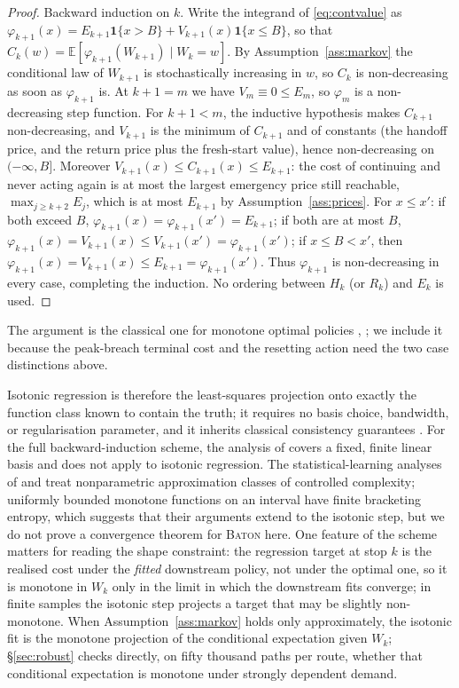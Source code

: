 \documentclass[preprint,authoryear,12pt]{elsarticle}
\theoremstyle{definition}
\theoremstyle{remark}
\begin{document}
\begin{proof}
Backward induction on $k$. Write the integrand of \eqref{eq:contvalue}
as $\varphi_{k+1}(x) = E_{k+1}\mathbf 1\{x > B\} +
V_{k+1}(x)\mathbf 1\{x \le B\}$, so that
$C_k(w) = \mathbb E[\varphi_{k+1}(W_{k+1}) \mid W_k = w]$. By
Assumption~\ref{ass:markov} the conditional law of $W_{k+1}$ is
stochastically increasing in $w$, so $C_k$ is non-decreasing as soon as
$\varphi_{k+1}$ is. At $k+1 = m$ we have $V_m \equiv 0 \le E_m$, so
$\varphi_m$ is a non-decreasing step function. For $k+1 < m$, the
inductive hypothesis makes $C_{k+1}$ non-decreasing, and $V_{k+1}$ is the
minimum of $C_{k+1}$ and of constants (the handoff price, and the
return price plus the fresh-start value), hence non-decreasing on
$(-\infty,B]$. Moreover $V_{k+1}(x) \le C_{k+1}(x) \le E_{k+1}$: the
cost of continuing and never acting again is at most the largest
emergency price still reachable, $\max_{j \ge k+2} E_j$, which is at most
$E_{k+1}$ by Assumption~\ref{ass:prices}. For $x \le x'$: if both
exceed $B$, $\varphi_{k+1}(x) = \varphi_{k+1}(x') = E_{k+1}$; if both
are at most $B$, $\varphi_{k+1}(x) = V_{k+1}(x) \le V_{k+1}(x') =
\varphi_{k+1}(x')$; if $x \le B < x'$, then
$\varphi_{k+1}(x) = V_{k+1}(x) \le E_{k+1} = \varphi_{k+1}(x')$. Thus
$\varphi_{k+1}$ is non-decreasing in every case, completing the
induction. No ordering between $H_k$ (or $R_k$) and $E_k$ is used.
\end{proof}

The argument is the classical one for monotone optimal policies
\citep{serfozo1976monotone}, \citep[\S4.7]{puterman1994markov}; we
include it because the peak-breach terminal cost and the resetting
action need the two case distinctions above.

Isotonic regression is therefore the least-squares projection onto
exactly the function class known to contain the truth; it requires no
basis choice, bandwidth, or regularisation parameter, and it inherits
classical consistency guarantees
\citep{robbins1955empirical,barlow1972statistical}. For the full
backward-induction scheme, the analysis of \citet{clement2002analysis}
covers a fixed, finite linear basis and does not apply to isotonic
regression. The statistical-learning analyses of
\citet{egloff2005monte} and \citet{zanger2013quantitative} treat
nonparametric approximation classes of controlled complexity; uniformly
bounded monotone functions on an interval have finite bracketing
entropy, which suggests that their arguments extend to the isotonic
step, but we do not prove a convergence theorem for \textsc{Baton}
here. One feature of the scheme matters for reading the shape
constraint: the regression target at stop $k$ is the realised cost under
the \emph{fitted} downstream policy, not under the optimal one, so it is
monotone in $W_k$ only in the limit in which the downstream fits
converge; in finite samples the isotonic step projects a target that may
be slightly non-monotone. When Assumption~\ref{ass:markov} holds only
approximately, the isotonic fit is the monotone projection of the
conditional expectation given $W_k$; \S\ref{sec:robust} checks directly,
on fifty thousand paths per route, whether that conditional expectation
is monotone under strongly dependent demand.
\end{document}
